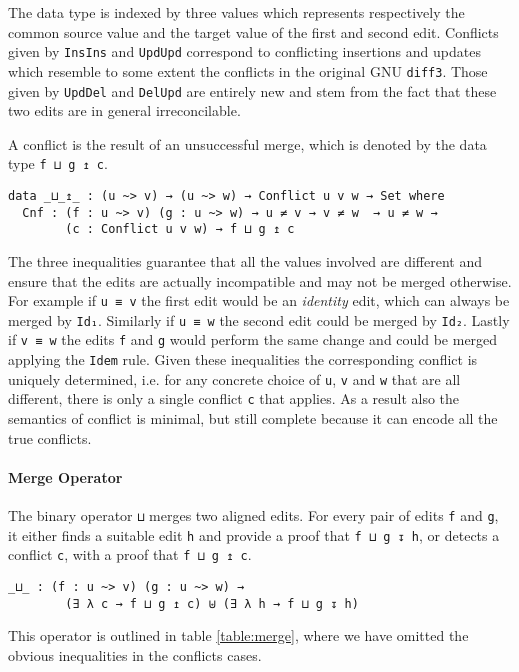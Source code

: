 \documentclass[preprint]{sigplanconf}
\begin{document}
	The data type is indexed by three values which represents respectively
	the common source value and the target value of the first and second
	edit.	Conflicts given by \texttt{InsIns} and \texttt{UpdUpd}	 correspond to 
	conflicting insertions and updates which resemble to some extent the
	conflicts in the original GNU \texttt{diff3}. Those given by \texttt{UpdDel} 
	and \texttt{DelUpd} are entirely new and stem from the fact that these two
	edits are in general irreconcilable.

	A conflict is the result of an unsuccessful merge, which is denoted
	by the data type \texttt{f ⊔ g ↥ c}.

\begin{verbatim}
data _⊔_↥_ : (u ~> v) → (u ~> w) → Conflict u v w → Set where
  Cnf : (f : u ~> v) (g : u ~> w) → u ≠ v → v ≠ w  → u ≠ w → 
        (c : Conflict u v w) → f ⊔ g ↥ c
\end{verbatim}

	The three inequalities guarantee that all the values involved are different
        and ensure that the edits are actually incompatible and may not be merged 
        otherwise. For example if \texttt{u ≡ v} the first edit would be an
        \emph{identity} edit, which can always be merged by
        \texttt{Id₁}. Similarly if \texttt{u ≡ w} the second edit could be merged
        by \texttt{Id₂}. Lastly if \texttt{v ≡ w} the edits \texttt{f} and \texttt{g}
        would perform the same change and could be merged applying the \texttt{Idem}
        rule.
        Given these inequalities the corresponding conflict is uniquely determined,
        i.e. for any concrete choice of \texttt{u}, \texttt{v} and \texttt{w} that
        are all different, there is only a single conflict \texttt{c} that applies.
	As a result also the semantics of conflict is minimal, but still complete
        because it can encode all the true conflicts.

	\paragraph{Merge Operator}
	The binary operator \texttt{⊔} merges 
	two aligned edits. For every pair of edits \texttt{f} and \texttt{g}, 
	it either finds a suitable edit \texttt{h} and provide
	a proof that \texttt{f ⊔ g ↧ h}, or detects a conflict \texttt{c}, 
	with a proof that \texttt{f ⊔ g ↥ c}.

\begin{verbatim}
_⊔_ : (f : u ~> v) (g : u ~> w) →
        (∃ λ c → f ⊔ g ↥ c) ⊎ (∃ λ h → f ⊔ g ↧ h)
\end{verbatim}
	This operator is outlined in table \ref{table:merge}, where we have
        omitted the obvious inequalities in the conflicts cases.
\end{document}

